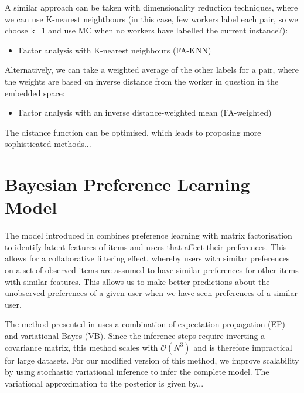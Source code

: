 A similar approach can be taken with dimensionality reduction techniques, where we can use K-nearest neightbours (in this case, few workers label each pair, so we choose k=1 and use MC when no workers have labelled the current instance?):
\begin{itemize}
   \item Factor analysis with K-nearest neighbours (FA-KNN)
\end{itemize}
Alternatively, we can take a weighted average of the other labels for a pair, where the weights are based on inverse distance from the worker in question in the embedded space:
\begin{itemize}
   \item Factor analysis with an inverse distance-weighted mean (FA-weighted)
\end{itemize}
The distance function can be optimised, which leads to proposing more sophisticated methods...

\section{Bayesian Preference Learning Model}

The model introduced in \cite{houlsby2012collaborative} combines preference learning with matrix factorisation 
to identify latent features of items and users that affect their preferences. This allows for a collaborative filtering effect, whereby users with similar preferences on a set of observed items are assumed to have similar 
preferences for other items with similar features. This allows us to make better predictions about the unobserved preferences of a given user when we have seen preferences of a similar user.

The method presented in \cite{houlsby2012collaborative} uses a combination of expectation propagation (EP) and variational Bayes (VB). Since the inference steps require inverting a covariance matrix, this method scales with 
$\mathcal{O}(N^3)$ and is therefore impractical for large datasets. For our modified version of this method, we improve scalability by using stochastic variational inference to infer the complete model. 
The variational approximation to the posterior is given by...

